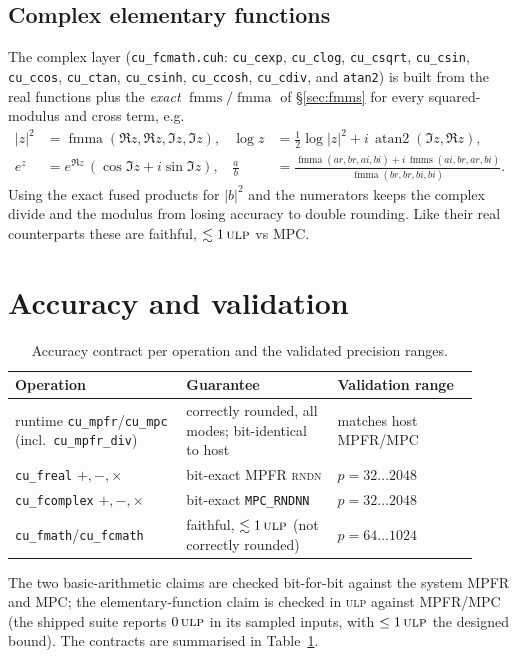 \documentclass[11pt,a4paper]{article}
\newcommand{\code}[1]{\texttt{#1}}
\newcommand{\PB}{\ensuremath{p}}
\newcommand{\ulp}{\textsc{ulp}}
\newcommand{\rndn}{\textsc{rndn}}
\newcommand{\fmma}{\ensuremath{\operatorname{fmma}}}
\newcommand{\fmms}{\ensuremath{\operatorname{fmms}}}
\begin{document}
\subsection{Complex elementary functions}
The complex layer (\code{cu\_fcmath.cuh}: \code{cu\_cexp}, \code{cu\_clog},
\code{cu\_csqrt}, \code{cu\_csin}, \code{cu\_ccos}, \code{cu\_ctan},
\code{cu\_csinh}, \code{cu\_ccosh}, \code{cu\_cdiv}, and \code{atan2}) is built
from the real functions plus the \emph{exact} $\fmms/\fmma$ of
\S\ref{sec:fmms} for every squared-modulus and cross term, e.g.
\begin{align}
|z|^2 &= \fmma(\Re z,\Re z,\Im z,\Im z), &
\log z &= \tfrac12\log|z|^2 + i\,\operatorname{atan2}(\Im z,\Re z),\\
e^{z} &= e^{\Re z}\,(\cos\Im z + i\sin\Im z), &
\tfrac{a}{b} &= \frac{\fmma(ar,br,ai,bi) + i\,\fmms(ai,br,ar,bi)}{\fmma(br,br,bi,bi)} .
\end{align}
Using the exact fused products for $|b|^2$ and the numerators keeps the complex
divide and the modulus from losing accuracy to double rounding. Like their real
counterparts these are faithful, $\lesssim 1\,\ulp$ vs MPC.


\section{Accuracy and validation}
\label{sec:accuracy}

\begin{table}[h]
\centering
\begin{tabular}{@{}p{0.34\linewidth}p{0.30\linewidth}p{0.28\linewidth}@{}}
\toprule
Operation & Guarantee & Validation range\\
\midrule
runtime \code{cu\_mpfr}/\code{cu\_mpc} (incl.\ \code{cu\_mpfr\_div}) & correctly rounded, all modes; bit-identical to host & matches host MPFR/MPC\\
\code{cu\_freal} $+,-,\times$ & bit-exact MPFR \rndn & $\PB=32\ldots2048$\\
\code{cu\_fcomplex} $+,-,\times$ & bit-exact \code{MPC\_RNDNN} & $\PB=32\ldots2048$\\
\code{cu\_fmath}/\code{cu\_fcmath} & faithful, $\lesssim 1\,\ulp$ (not correctly rounded) & $\PB=64\ldots1024$\\
\bottomrule
\end{tabular}
\caption{Accuracy contract per operation and the validated precision ranges.}
\label{tab:accuracy}
\end{table}

The two basic-arithmetic claims are checked bit-for-bit against the system MPFR
and MPC; the elementary-function claim is checked in \ulp{} against MPFR/MPC (the
shipped suite reports $0\,\ulp$ in its sampled inputs, with $\le 1\,\ulp$ the
designed bound). The contracts are summarised in Table~\ref{tab:accuracy}.
\end{document}

